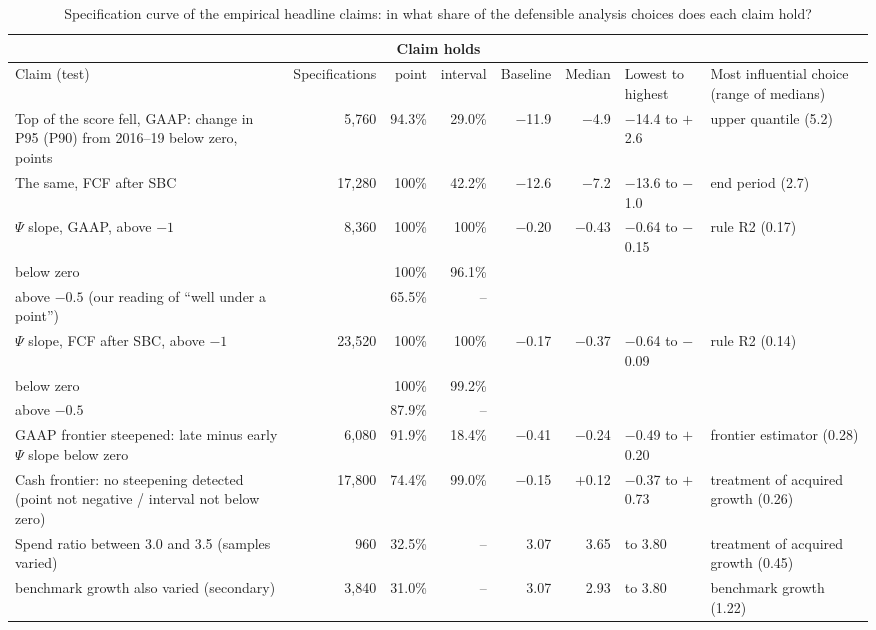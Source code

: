 \begin{table}[t]\centering\footnotesize\setlength{\tabcolsep}{3pt}
\caption{Specification curve of the empirical headline claims: in what share of the defensible analysis choices does each claim hold?}\label{tab:spec_curve}
\begin{tabular}{@{}>{\raggedright\arraybackslash}p{4.9cm}rrrrr>{\raggedright\arraybackslash}p{2.0cm}>{\raggedright\arraybackslash}p{2.4cm}@{}}\toprule
 & & \multicolumn{2}{c}{Claim holds} & & & & \\\cmidrule(lr){3-4}
Claim (test) & Specifi\-cations & point & interval & Baseline & Median & Lowest to highest & Most influential choice (range of medians)\\\midrule
Top of the score fell, GAAP: change in P95 (P90) from 2016--19 below zero, points & 5{,}760 & 94.3\% & 29.0\% & $-$11.9 & $-$4.9 & $-$14.4 to $+$2.6 & upper quantile (5.2)\\
The same, FCF after SBC & 17{,}280 & 100\% & 42.2\% & $-$12.6 & $-$7.2 & $-$13.6 to $-$1.0 & end period (2.7)\\
$\Psi$ slope, GAAP, above $-1$ & 8{,}360 & 100\% & 100\% & $-$0.20 & $-$0.43 & $-$0.64 to $-$0.15 & rule R2 (0.17)\\
\quad below zero &  & 100\% & 96.1\% &  &  &  & \\
\quad above $-0.5$ (our reading of ``well under a point'') &  & 65.5\% & -- &  &  &  & \\
$\Psi$ slope, FCF after SBC, above $-1$ & 23{,}520 & 100\% & 100\% & $-$0.17 & $-$0.37 & $-$0.64 to $-$0.09 & rule R2 (0.14)\\
\quad below zero &  & 100\% & 99.2\% &  &  &  & \\
\quad above $-0.5$ &  & 87.9\% & -- &  &  &  & \\
GAAP frontier steepened: late minus early $\Psi$ slope below zero & 6{,}080 & 91.9\% & 18.4\% & $-$0.41 & $-$0.24 & $-$0.49 to $+$0.20 & frontier estimator (0.28)\\
Cash frontier: no steepening detected (point not negative / interval not below zero) & 17{,}800 & 74.4\% & 99.0\% & $-$0.15 & $+$0.12 & $-$0.37 to $+$0.73 & treatment of acquired growth (0.26)\\
Spend ratio between 3.0 and 3.5 (samples varied) & 960 & 32.5\% & -- & 3.07 & 3.65 & 3.05 to 3.80 & treatment of acquired growth (0.45)\\
\quad benchmark growth also varied (secondary) & 3{,}840 & 31.0\% & -- & 3.07 & 2.93 & 2.05 to 3.80 & benchmark growth (1.22)\\

\end{tabular}
\end{table}
